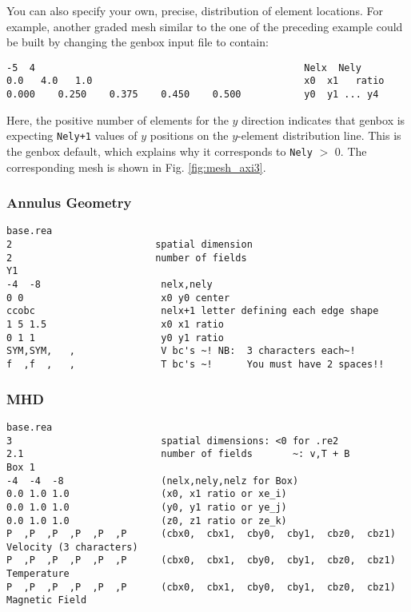 You can also specify your own, precise, distribution of element
locations.   For example, another graded mesh similar to the
one of the preceding example could be built by changing the
genbox input file to contain:


\begin{verbatim}
-5  4                                               Nelx  Nely
0.0   4.0   1.0                                     x0  x1   ratio
0.000    0.250    0.375    0.450    0.500           y0  y1 ... y4
\end{verbatim}

\noindent
Here, the positive number of elements for the \(y\) direction indicates
that genbox is expecting {\tt Nely+1} values of \(y\) positions on the
\(y\)-element distribution line.   This is the genbox default, which
explains why it corresponds to {\tt Nely} \(>\) 0.  The corresponding mesh
is shown in Fig. \ref{fig:mesh_axi3}.

\subsubsection{Annulus Geometry}
\begin{verbatim}base.rea
2                         spatial dimension
2                         number of fields
Y1
-4  -8                     nelx,nely
0 0                        x0 y0 center
ccobc                      nelx+1 letter defining each edge shape
1 5 1.5                    x0 x1 ratio
0 1 1                      y0 y1 ratio
SYM,SYM,   ,               V bc's ~! NB:  3 characters each~! 
f  ,f  ,   ,               T bc's ~!      You must have 2 spaces!!
\end{verbatim}

\subsubsection{MHD}
\begin{verbatim}base.rea
3                          spatial dimensions: <0 for .re2
2.1                        number of fields       ~: v,T + B
Box 1
-4  -4  -8                 (nelx,nely,nelz for Box)
0.0 1.0 1.0                (x0, x1 ratio or xe_i)
0.0 1.0 1.0                (y0, y1 ratio or ye_j)
0.0 1.0 1.0                (z0, z1 ratio or ze_k)
P  ,P  ,P  ,P  ,P  ,P      (cbx0,  cbx1,  cby0,  cby1,  cbz0,  cbz1)  Velocity (3 characters)
P  ,P  ,P  ,P  ,P  ,P      (cbx0,  cbx1,  cby0,  cby1,  cbz0,  cbz1)  Temperature
P  ,P  ,P  ,P  ,P  ,P      (cbx0,  cbx1,  cby0,  cby1,  cbz0,  cbz1)  Magnetic Field
\end{verbatim}

